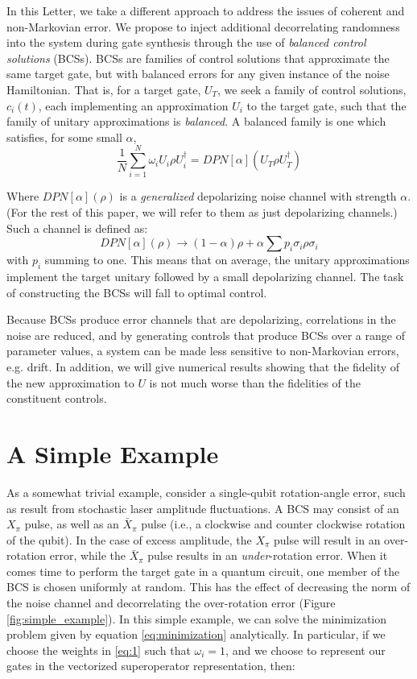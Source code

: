 \documentclass[aps,nofootinbib,pra,notitlepage,twocolumn]{revtex4-1}
\begin{document}
In this Letter, we take a different approach to address the issues of coherent and non-Markovian error. We propose to inject additional decorrelating randomness into the system during gate synthesis through the use of \emph{balanced control solutions} (BCSs). BCSs are families of control solutions that approximate the same target gate, but with balanced errors for any given instance of the noise Hamiltonian. That is, for a target gate, $U_T$, we seek a family of control solutions, $c_i(t)$, each implementing an approximation $U_i$ to the target gate, such that the family of unitary approximations is \emph{balanced}. A balanced family is one which satisfies, for some small $\alpha$,
\begin{equation}\label{eq:1}
  \frac{1}{N}\sum_{i=1}^N \omega_i U_i \rho U_i^\dagger = DPN[\alpha]\left(U_T \rho U_T^\dagger \right)
\end{equation}

Where $DPN[\alpha](\rho)$ is a \textit{generalized} depolarizing noise channel with strength $\alpha$. (For the rest of this paper, we will refer to them as just depolarizing channels.) Such a channel is defined as:
\begin{equation}\label{eq:2}
  DPN[\alpha](\rho) \rightarrow (1-\alpha)\rho + \alpha\sum p_i \sigma_i\rho\sigma_i
\end{equation}
with $p_i$ summing to one. This means that on average, the unitary approximations implement the target unitary followed by a small depolarizing channel. The task of constructing the BCSs will fall to optimal control.

Because BCSs produce error channels that are depolarizing, correlations in the noise are reduced, and by generating controls that produce BCSs over a range of parameter values, a system can be made less sensitive to non-Markovian errors, e.g. drift. In addition, we will give numerical results showing that the fidelity of the new approximation to $U$ is not much worse than the fidelities of the constituent controls. 

\section{A Simple Example}
As a somewhat trivial example, consider a single-qubit rotation-angle error, such as result from stochastic laser amplitude fluctuations. A BCS may consist of an $X_\pi$ pulse, as well as an $\bar X_\pi$ pulse (i.e., a clockwise and counter clockwise rotation of the qubit). In the case of excess amplitude, the $X_\pi$ pulse will result in an over-rotation error, while the $\bar X_\pi$ pulse results in an \emph{under}-rotation error. When it comes time to perform the target gate in a quantum circuit, one member of the BCS is chosen uniformly at random. This has the effect of decreasing the norm of the noise channel and decorrelating the over-rotation error (Figure \ref{fig:simple_example}). In this simple example, we can solve the minimization problem given by equation \ref{eq:minimization} analytically. In particular, if we choose the weights in \ref{eq:1} such that $\omega_i=1$, and we choose to represent our gates in the vectorized superoperator representation, then:
\end{document}
